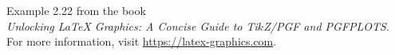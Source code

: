 \documentclass{article}
\begin{document}
Example 2.22 from the book\\
\emph{Unlocking LaTeX Graphics: A Concise Guide to Ti$k$Z/PGF and PGFPLOTS}.\\
For more information, visit \url{https://latex-graphics.com}.
\par\bigskip

\end{document}
